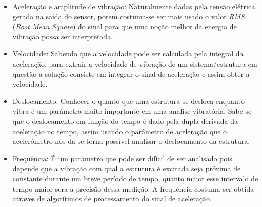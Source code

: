 \begin{itemize}
  \item Aceleração e amplitude de vibração: Naturalmente dadas pela tensão elétrica gerada na saída do sensor, porem costuma-se ser mais usado o valor \textit{RMS} (\textit{Root Mean Square}) do sinal para que uma noção melhor da energia de vibração possa ser interpretada.
  \item Velocidade: Sabendo que a velocidade pode ser calculada pela integral da aceleração, para extrair a velocidade de vibração de um sistema/estrutura em questão a solução consiste em integrar o sinal de aceleração e assim obter a velocidade.
  \item Deslocamento: Conhecer o quanto que uma estrutura se desloca enquanto vibra é um parâmetro muito importante em uma analise vibratória. Sabe-se que o deslocamento em função do tempo é dado pela dupla derivada da aceleração no tempo, assim usando o parâmetro de aceleração que o acelerômetro nos da se torna possível analisar o deslocamento da estrutura.
  \item Frequência: É um parâmetro que pode ser difícil de ser analisado pois depende que a vibração com qual a estrutura é excitada seja próxima de constante durante um breve período de tempo, quanto maior esse intervalo de tempo maior sera a precisão dessa medição. A frequência costuma ser obtida atraves de algorítimos de processamento do sinal de aceleração.
\end{itemize}

